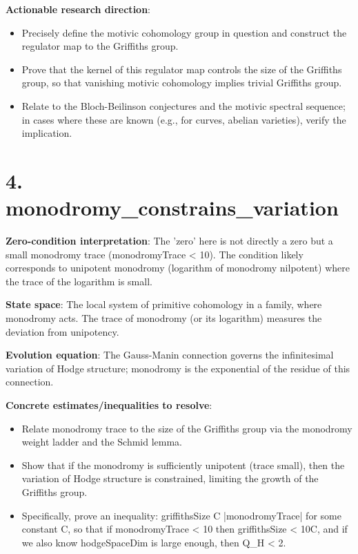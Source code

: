 \documentclass[11pt]{article}
\begin{document}
\textbf{Actionable research direction}:
\begin{itemize}
\item Precisely define the motivic cohomology group in question and construct the regulator map to the Griffiths group.
\item Prove that the kernel of this regulator map controls the size of the Griffiths group, so that vanishing motivic cohomology implies trivial Griffiths group.
\item Relate to the Bloch-Beilinson conjectures and the motivic spectral sequence; in cases where these are known (e.g., for curves, abelian varieties), verify the implication.
\end{itemize}

\section{4. monodromy\_constrains\_variation}

\textbf{Zero-condition interpretation}: The 'zero' here is not directly a zero but a small monodromy trace (monodromyTrace < 10). The condition likely corresponds to unipotent monodromy (logarithm of monodromy nilpotent) where the trace of the logarithm is small.

\textbf{State space}: The local system of primitive cohomology in a family, where monodromy acts. The trace of monodromy (or its logarithm) measures the deviation from unipotency.

\textbf{Evolution equation}: The Gauss-Manin connection governs the infinitesimal variation of Hodge structure; monodromy is the exponential of the residue of this connection.

\textbf{Concrete estimates/inequalities to resolve}:
\begin{itemize}
\item Relate monodromy trace to the size of the Griffiths group via the monodromy weight ladder and the Schmid lemma.
\item Show that if the monodromy is sufficiently unipotent (trace small), then the variation of Hodge structure is constrained, limiting the growth of the Griffiths group.
\item Specifically, prove an inequality: griffithsSize \leq C \cdot |monodromyTrace| for some constant C, so that if monodromyTrace < 10 then griffithsSize < 10C, and if we also know hodgeSpaceDim is large enough, then Q\_H < 2.
\end{itemize}
\end{document}
